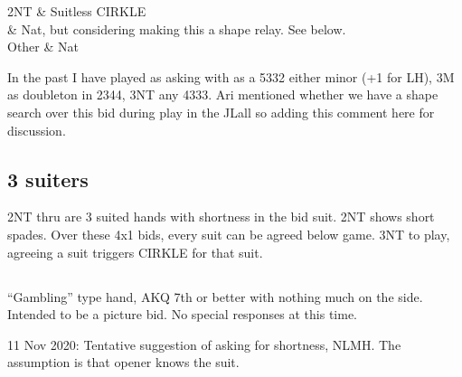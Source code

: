 \documentclass[tom-ari]{subfile}
\begin{document}
	\begin{bidtable}{}
		2NT & Suitless CIRKLE \\
		 & Nat, but considering making this a shape relay. See below. \\
		Other & Nat \\
	\end{bidtable}

	\pagebreak
	
	\begin{noted}
		In the past I have played  as asking with  as a 5332 either minor (+1 for LH), 3M as doubleton in 2344, 3NT any 4333. Ari mentioned whether we have a shape search over this bid during play in the JLall so adding this comment here for discussion.
	\end{noted}

	\subsection{3 suiters}
	
	2NT thru  are 3 suited hands with shortness in the bid suit. 2NT shows short spades. Over these 4x1 bids, every suit can be agreed below game. 3NT to play, agreeing a suit triggers CIRKLE for that suit.
	
	\subsection[3S]{}
	
	``Gambling'' type hand, AKQ 7th or better with nothing much on the side. Intended to be a picture bid. No special responses at this time. 

	11 Nov 2020:  Tentative suggestion of  asking for shortness, NLMH.  The assumption is that opener knows the suit. 
\end{document}
